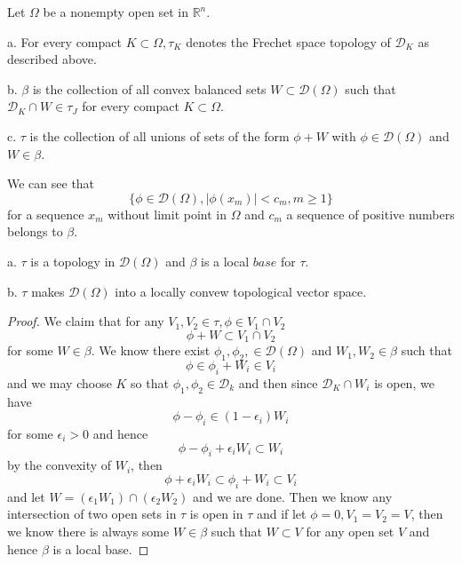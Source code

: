 \documentclass[lang=en, color=blue, ]{elegantbook}
\newcommand{\R}{\mathbb{R}}
\newcommand{\D}{\mathscr{D}}
\begin{document}
\begin{definition}
    Let $\Omega$ be a nonempty open set in $\R^n$.\par
    a. For every compact $K\subset\Omega,\tau_K$ denotes the Frechet space topology of $\D_K$ as described above.\par
    b. $\beta$ is the collection of all convex balanced sets $W\subset\D(\Omega)$ such that $\D_K\cap W \in \tau_J$ for every compact $K\subset\Omega$.\par
    c. $\tau$ is the collection of all unions of sets of the form $\phi+W$ with $\phi\in\D(\Omega)$ and $W\in\beta$.
\end{definition}
    We can see that
    \[\{\phi\in\D(\Omega),|\phi(x_m)|<c_m,m\geq 1\}\]
    for a sequence $x_m$ without limit point in $\Omega$ and $c_m$ a sequence of positive numbers belongs to $\beta$.

\begin{theorem}
    a. $\tau$ is a topology in $\D(\Omega)$ and $\beta$ is a local $base$ for $\tau$.\par
    b. $\tau$ makes $\D(\Omega)$ into a locally convew topological vector space.
\end{theorem}
\begin{proof}
    We claim that for any $V_1,V_2\in \tau, \phi \in V_1\cap V_2$
    \[\phi + W \subset V_1\cap V_2\]
    for some $W\in\beta$. We know there exist $\phi_1,\phi_2, \in \D(\Omega)$ and $W_1,W_2\in\beta$ such that
    \[
    \phi \in \phi_i + W_i \in V_i
    \]
    and we may choose $K$ so that $\phi_1,\phi_2\in\D_k$ and then since $\D_K\cap W_i$ is open, we have
    \[\phi - \phi_i \in (1-\epsilon_i)W_i\]
    for some $\epsilon_i>0$ and hence
    \[
    \phi-\phi_i+\epsilon_iW_i \subset W_i
    \]
    by the convexity of $W_i$, then
    \[\phi+\epsilon_iW_i \subset \phi_i + W_i \subset V_i\]
    and let $W = (\epsilon_1W_1)\cap(\epsilon_2W_2)$ and we are done. Then we know any intersection of two open sets in $\tau$ is open in $\tau$ and if let $\phi = 0, V_1=V_2=V$, then we know there is always some $W\in\beta$ such that $W\subset V$ for any open set $V$ and hence $\beta$ is a local base.\par
\end{proof}
\end{document}
